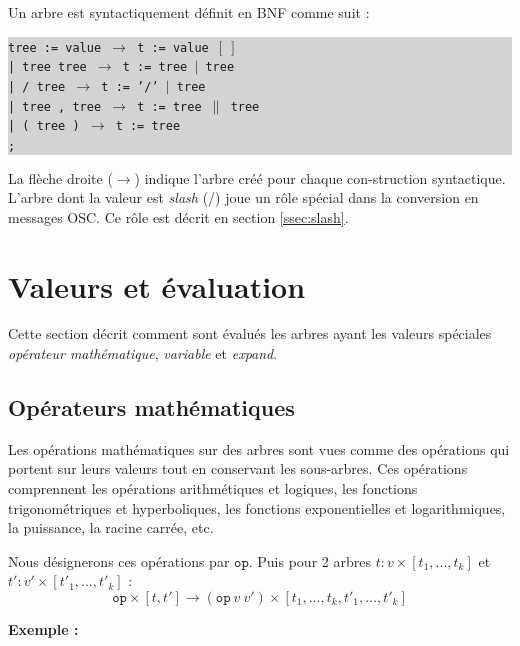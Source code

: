\documentclass{article}
\newcommand{\exemple}	{\vspace*{2mm}\hspace*{-4mm}\textbf{Exemple :}}
\newcommand{\code}	[2][0.9]	{\vspace{0mm}\begin{center}\colorbox{lightgrey}{
							\begin{minipage}[t]{#1\columnwidth} 
							{\small \texttt{#2}}
							\end{minipage}}\end{center}}
\newcommand{\llist}	[1]		{\ensuremath{[#1_1,...,#1_k]}}
\newcommand{\seq}		{\ensuremath{|}}
\newcommand{\paral}		{\ensuremath{\parallel}}
\newcommand{\binop}		{\ensuremath{\texttt{op}}}
\newcommand{\etc}		{\ensuremath{\text{…}}}
\newcommand{\emptyf}	{\ensuremath{[\ ]}}
\newcommand{\ula}		{\hspace*{8mm}}
\begin{document}
Un arbre est syntactiquement définit en BNF comme suit :
\code{tree := value      \hspace*{8mm} $\to$ t := value \emptyf \\
\ula | tree tree         \hspace*{4mm} $\to$ t := tree \seq\ tree \\
\ula | / tree            \hspace*{9.7mm} $\to$ t := '/' \seq\ tree\\
\ula | tree , tree       \hspace*{0mm}  $\to$ t := tree \paral\ tree \\
\ula | ( tree )          \hspace*{6mm} $\to$ t := tree \\
\ula ;
}
La flèche droite ($\to$) indique l'arbre créé pour chaque con-struction syntactique. 
L'arbre dont la valeur est \emph{slash} (/) joue un rôle spécial dans la conversion en messages OSC. Ce rôle est décrit en section \ref{ssec:slash}.


\section{Valeurs et évaluation}\label{sec:valeurs}

Cette section décrit comment sont évalués les arbres ayant les valeurs spéciales \emph{opérateur mathématique}, \emph{variable} et \emph{expand}.

\subsection{Opérateurs mathématiques}

Les opérations mathématiques sur des arbres sont vues comme des opérations qui portent sur leurs valeurs tout en conservant les sous-arbres. Ces opérations comprennent les opérations arithmétiques et logiques, les fonctions trigonométriques et hyperboliques, les fonctions exponentielles et logarithmiques, la puissance, la racine carrée, etc.

Nous désignerons ces opérations par \binop. Puis pour 2 arbres $t : v \times \llist{t}$ et $t' : v' \times \llist{t'}$ :
\[
	\binop \times [ t, t']  \to  (\binop\ v\ v') \times [ t_1,\etc,t_k,t'_1,\etc,t'_k ]
\]


\exemple
\end{document}
